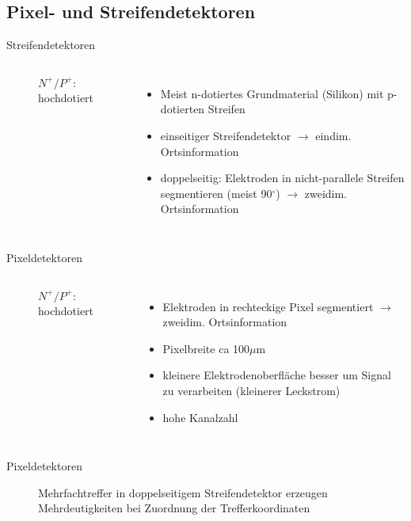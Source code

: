 \subsection[]{Pixel- und Streifendetektoren}


\begin{frame}{Streifendetektoren}
	\begin{columns}[T]
			\begin{figure}[htbp]
			  \centering
			   
			  \caption*{$N^+/P^+$: hochdotiert}
			\end{figure}
	    	\begin{itemize}
			  \item Meist n-dotiertes Grundmaterial (Silikon) mit p-dotierten Streifen
			  \item einseitiger Streifendetektor $\rightarrow$ eindim. Ortsinformation
			  \item doppelseitig: Elektroden in nicht-parallele Streifen segmentieren (meist 90$^\circ$)
			  $\rightarrow$ zweidim. Ortsinformation
			\end{itemize}
    \end{columns}
\end{frame}

\begin{frame}{Pixeldetektoren}
	\begin{columns}[T]
			\begin{figure}[htbp]
			  \centering
			  
			  \caption*{$N^+/P^+$: hochdotiert}
			\end{figure}	
	    	\begin{itemize}
			  \item Elektroden in rechteckige Pixel segmentiert $\rightarrow$ zweidim. Ortsinformation
			  \item Pixelbreite ca 100$\mu$m
			  \item kleinere Elektrodenoberfläche besser um Signal zu verarbeiten (kleinerer Leckstrom)
			  \item hohe Kanalzahl
			\end{itemize}
    \end{columns}
\end{frame}


\begin{frame}{Pixeldetektoren}
			\begin{figure}[htbp]
			  \centering
			  
			  \caption*{Mehrfachtreffer in doppelseitigem Streifendetektor erzeugen Mehrdeutigkeiten bei
			  Zuordnung der Trefferkoordinaten}
			\end{figure}
			 \vspace{1cm}
\end{frame}


